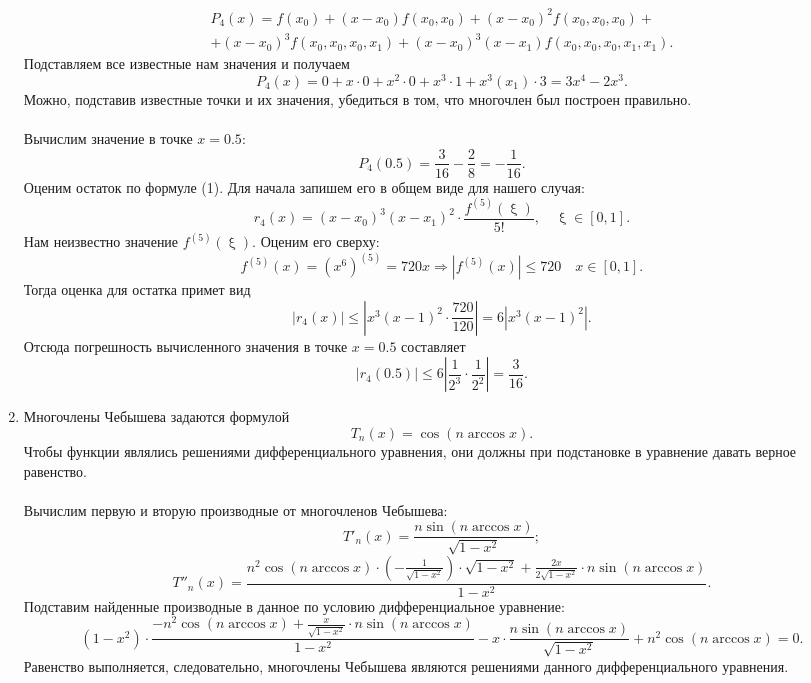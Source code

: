 \documentclass[a4paper, 12pt]{article}
\renewcommand{\leq}{\leqslant}
\renewcommand{\xi}{\upxi}
\begin{document}
\begin{enumerate}
	\begin{multline*}
		P_4(x) = f(x_0) + (x-x_0)f(x_0, x_0) + (x-x_0)^2f(x_0, x_0,x_0)+\\+ (x-x_0)^3f(x_0, x_0,x_0, x_1) + (x-x_0)^3(x-x_1)f(x_0, x_0,x_0, x_1, x_1).
	\end{multline*}
	Подставляем все известные нам значения и получаем
	$$P_4(x) = 0 + x\cdot 0 + x^2\cdot 0 + x^3\cdot 1 + x^3(x_1)\cdot 3 = 3x^4 - 2x^3.$$
	Можно, подставив известные точки и их значения, убедиться в том, что многочлен был построен правильно. \\\\
	Вычислим значение в точке $x=0.5$:
	$$P_4(0.5) = \dfrac{3}{16} - \dfrac{2}{8} = -\dfrac{1}{16}.$$
	Оценим остаток по формуле (1). Для начала запишем его в общем виде для нашего случая:
	$$r_4(x) = (x-x_0)^3 ( x-x_1)^2\cdot \dfrac{f^{(5)}(\xi)}{5!},\quad \xi \in [0,1].$$
	Нам неизвестно значение $f^{(5)}(\xi)$. Оценим его сверху:
	$$f^{(5)}(x) = (x^6)^{(5)} = 720 x\Rightarrow |f^{(5)}(x)| \leq 720 \quad x\in [0,1].$$
	Тогда оценка для остатка примет вид
	$$|r_4(x)|\leq \left|x^3 ( x-1)^2\cdot \dfrac{720}{120}\right| = 6\left|x^3 ( x-1)^2\right|.$$
	Отсюда погрешность вычисленного значения в точке $x=0.5$ составляет $$|r_4(0.5)|\leq 6\left|\dfrac{1}{2^3} \cdot\dfrac{1}{2^2}\right| = \dfrac{3}{16}.$$
	
	\newpage
	\item 
	\hypertarget{t8}{}
	Многочлены Чебышева задаются формулой $$T_n(x) = \cos (n\arccos x).$$
	Чтобы функции являлись решениями дифференциального уравнения, они должны при подстановке в уравнение давать верное равенство. \\\\
	Вычислим первую и вторую производные от многочленов Чебышева:
	$$T'_n(x) = \dfrac{n \sin (n\arccos x)}{\sqrt{1-x^2}};$$
	$$T''_n(x) = \dfrac{n^2\cos (n\arccos x) \cdot (-\frac{1}{\sqrt{1-x^2}})\cdot \sqrt{1-x^2} + \frac{2x}{2\sqrt{1-x^2}} \cdot n \sin (n\arccos x)}{1-x^2}.$$
	Подставим найденные производные в данное по условию дифференциальное уравнение:
	$$(1-x^2)\cdot \dfrac{-n^2\cos (n\arccos x) + \frac{x}{\sqrt{1-x^2}} \cdot n \sin (n\arccos x)}{1-x^2} -x\cdot \dfrac{n \sin (n\arccos x)}{\sqrt{1-x^2}} + n^2 \cos(n\arccos x) = 0.$$
	Равенство выполняется, следовательно, многочлены Чебышева являются решениями данного дифференциального уравнения.
	

\end{enumerate}
\end{document}
